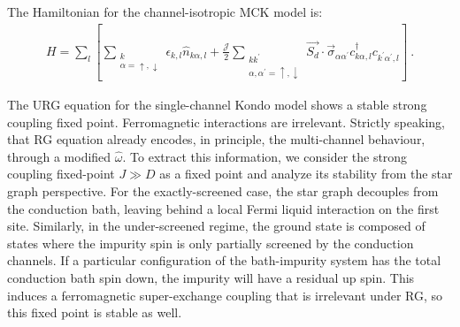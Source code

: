 \documentclass[12pt]{iopart}
\begin{document}
The Hamiltonian for the channel-isotropic MCK model is:
\begin{eqnarray}
	H = \sum_l\left[\sum_{\substack{k\\\alpha=\uparrow,\downarrow}}\epsilon_{k,l} \hat n_{k\alpha,l} + \frac{\mathcal{J}}{2}\sum_{\substack{kk^\prime\\\alpha,\alpha^\prime= \uparrow,\downarrow}} \vec{S_d}\cdot\vec{\sigma}_{\alpha\alpha^\prime}c_{k\alpha,l}^\dagger c_{k^\prime\alpha^\prime, l}\right]~.
\end{eqnarray}

The URG equation for the single-channel Kondo model \cite{kondo_urg} shows a stable strong coupling fixed point. Ferromagnetic interactions are irrelevant. Strictly speaking, that RG equation already encodes, in principle, the multi-channel behaviour, through a modified \(\hat \omega\). To extract this information, we consider the strong coupling fixed-point \(J \gg D\) as a fixed point and analyze its stability from the star graph perspective. For the exactly-screened case, the star graph decouples from the conduction bath, leaving behind a local Fermi liquid interaction on the first site. Similarly, in the under-screened regime, the ground state is composed of states where the impurity spin is only partially screened by the conduction channels. If a particular configuration of the bath-impurity system has the total conduction bath spin down, the impurity will have a residual up spin. This induces a ferromagnetic super-exchange coupling that is irrelevant under RG, so this fixed point is stable as well. 
\end{document}

